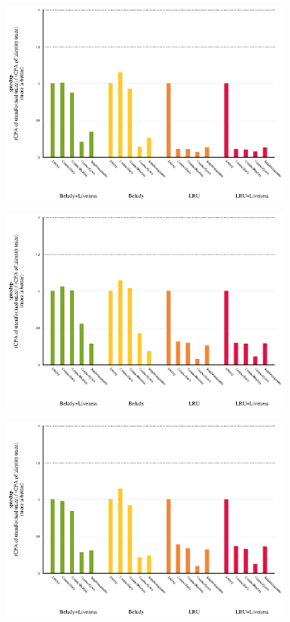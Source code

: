 \documentclass[onecolumn, openright, master, english, signatures]{dbrgrptt}
\begin{document}
\begin{figure}[!ht]
\begin{subfigure}[b]{0.5\textwidth}
    \includegraphics[width=\textwidth]{figs/plots/speedup-483-xalancbmk.eps}
  \end{subfigure}%
  \qquad
  \begin{subfigure}[b]{0.5\textwidth}%
    \includegraphics[width=\textwidth]{figs/plots/speedup-deltablue.eps}
  \end{subfigure}%
  \begin{subfigure}[b]{0.5\textwidth}%
    \includegraphics[width=\textwidth]{figs/plots/speedup-raytrace.eps}

\end{subfigure}
\end{figure}
\end{document}
